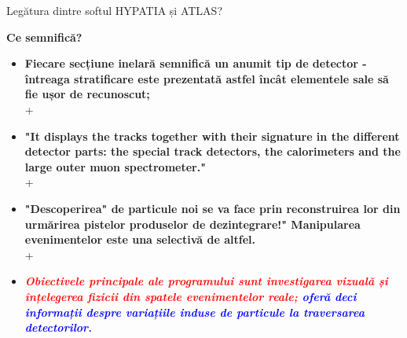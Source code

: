 \documentclass{beamer}
\begin{document}
\begin{frame}{Legătura dintre softul HYPATIA și ATLAS?}


\end{frame}


\begin{frame}{\textbf{Ce semnifică?}}


 \begin{itemize}
     \small
 \item[\ding{45}]{\makebox[0.5cm]{} \textbf{Fiecare secțiune inelară semnifică un anumit tip de detector - întreaga stratificare este prezentată astfel încât elementele sale să fie ușor de recunoscut;}} \\
  +
  \item[\ding{45}]{\makebox[0.5cm]{} \textbf{"It displays the tracks together with their signature in the different detector parts: the special track detectors, the calorimeters and the large outer muon spectrometer."}}\\
 +
    \item[\ding{45}]{\makebox[0.5cm]{} \textbf{ 
   "Descoperirea" de particule noi se va face prin reconstruirea lor din urmărirea pistelor produselor de dezintegrare!" Manipularea evenimentelor este una selectivă de altfel.}}\\
  +
   \item[\ding{45}]{\makebox[0.5cm]{} \textbf{\textcolor{red}{\textit{ 
   Obiectivele principale ale programului sunt investigarea vizuală și înțelegerea fizicii din spatele evenimentelor reale; \textcolor{blue}{oferă deci informații despre variațiile induse de particule la traversarea detectorilor.}}}}}


\end{itemize}  
\end{frame}
\end{document}
